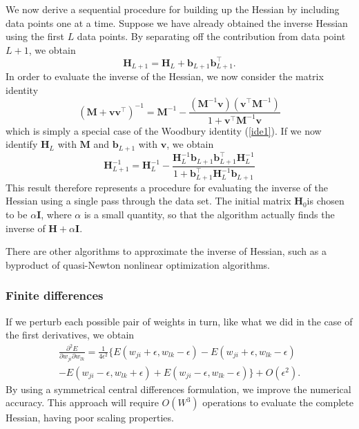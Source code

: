 \documentclass[a4paper]{report}
\renewcommand{\bf}{\mathbf}
\begin{document}
We now derive a sequential procedure for building up the Hessian by including data points one at a time. Suppose we have already obtained the inverse Hessian using the first $L$ data points. By separating off the contribution from data point $L+1$, we obtain
\begin{equation}
	\bf{H}_{L+1} = \bf{H}_L + \bf{b}_{L+1} \bf{b}_{L+1}^{\intercal}.
\end{equation}
In order to evaluate the inverse of the Hessian, we now consider the matrix identity
\begin{equation}
	(\bf{M}+\bf{vv}^{\intercal})^{-1} = \bf{M}^{-1} - \frac{(\bf{M}^{-1}\bf{v})(\bf{v}^{\intercal}\bf{M}^{-1})}{1+\bf{v}^{\intercal} \bf{M}^{-1} \bf{v}}
\end{equation}
which is simply a special case of the Woodbury identity (\ref{ide1}). If we now identify $\bf{H}_L$ with $\bf{M}$ and $\bf{b}_{L+1}$ with $\bf{v}$, we obtain
\begin{equation}
	\bf{H}_{L+1}^{-1} = \bf{H}_L^{-1} - \frac{\bf{H}_L^{-1}\bf{b}_{L+1}\bf{b}_{L+1}^{\intercal} \bf{H}_L^{-1}}{1+\bf{b}_{L+1}^{\intercal}\bf{H}_L^{-1}\bf{b}_{L+1}}
\end{equation}
This result therefore represents a procedure for evaluating the inverse of the Hessian using a single pass through the data set. The initial matrix $\bf{H}_0 $is chosen to be $\alpha \bf{I}$, where $\alpha$ is a small quantity, so that the algorithm actually finds the inverse of $\bf{H}+\alpha \bf{I}$.

There are other algorithms to approximate the inverse of Hessian, such as a byproduct of quasi-Newton nonlinear optimization algorithms.
\subsubsection{Finite differences}
If we perturb each possible pair of weights in turn, like what we did in the case of the first derivatives, we obtain
\begin{align}
	\frac{\partial^2 E}{\partial w_{ji} \partial w_{lk}} = \frac{1}{4 \epsilon^2} \{ E(w_{ji}+\epsilon,w_{lk}-\epsilon)-E(w_{ji}+\epsilon,w_{lk}-\epsilon)\\-E(w_{ji}-\epsilon,w_{lk}+\epsilon)+E(w_{ji}-\epsilon,w_{lk}-\epsilon) \} +O(\epsilon
	^2).
\end{align}
By using a symmetrical central differences formulation, we improve the numerical accuracy. This approach will require $O(W^3)$ operations to evaluate the complete Hessian, having poor scaling properties.
\end{document}
